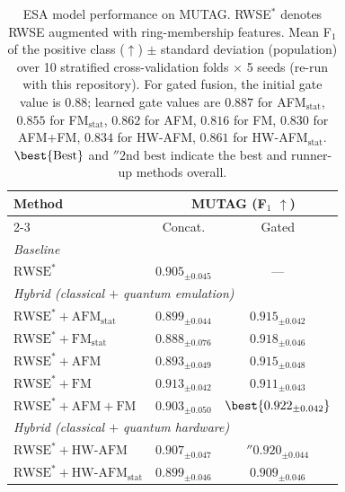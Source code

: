 \begin{table}[t]
\caption{%
ESA model performance on MUTAG.
RWSE$^{*}$ denotes RWSE augmented with ring-membership features.
Mean F$_1$ of the positive class ($\uparrow$) $\pm$ standard deviation (population) over 10 stratified cross-validation folds $\times$ 5 seeds (re-run with this repository).
For gated fusion, the initial gate value is $0.88$; learned gate values are $0.887$ for AFM$_{\mathrm{stat}}$, $0.855$ for FM$_{\mathrm{stat}}$, $0.862$ for AFM, $0.816$ for FM, $0.830$ for AFM+FM, $0.834$ for HW-AFM, $0.861$ for HW-AFM$_{\mathrm{stat}}$.
\mbox{$\best{\text{Best}}$} and \mbox{$\second{\text{2nd best}}$} indicate the best and runner-up methods overall.
}
\label{tab:mutag-esa}
\centering
\small
\begin{tabular}{l c c}
\toprule
\multirow{2}{*}{Method} & \multicolumn{2}{c}{MUTAG (F$_1$ $\uparrow$)} \\
\cmidrule(lr){2-3}
 & Concat. & Gated \\
\midrule
\multicolumn{3}{l}{\textit{Baseline}} \\
  $\text{RWSE}^{*}$ & $0.905{_{\pm 0.045}}$ & --- \\
\midrule
\multicolumn{3}{l}{\textit{Hybrid (classical ${+}$ quantum emulation)}} \\
  $\text{RWSE}^{*}{+}\text{AFM}_{\text{stat}}$ & $0.899{_{\pm 0.044}}$ & $0.915{_{\pm 0.042}}$ \\
  $\text{RWSE}^{*}{+}\text{FM}_{\text{stat}}$ & $0.888{_{\pm 0.076}}$ & $0.918{_{\pm 0.046}}$ \\
  $\text{RWSE}^{*}{+}\text{AFM}$ & $0.893{_{\pm 0.049}}$ & $0.915{_{\pm 0.048}}$ \\
  $\text{RWSE}^{*}{+}\text{FM}$ & $0.913{_{\pm 0.042}}$ & $0.911{_{\pm 0.043}}$ \\
  $\text{RWSE}^{*}{+}\text{AFM}{+}\text{FM}$ & $0.903{_{\pm 0.050}}$ & $\best{0.922{_{\pm 0.042}}}$ \\
\midrule
\multicolumn{3}{l}{\textit{Hybrid (classical ${+}$ quantum hardware)}} \\
  $\text{RWSE}^{*}{+}\text{HW-AFM}$ & $0.907{_{\pm 0.047}}$ & $\second{0.920}{_{\pm 0.044}}$ \\
  $\text{RWSE}^{*}{+}\text{HW-AFM}_{\text{stat}}$ & $0.899{_{\pm 0.046}}$ & $0.909{_{\pm 0.046}}$ \\
\bottomrule
\end{tabular}
\end{table}
